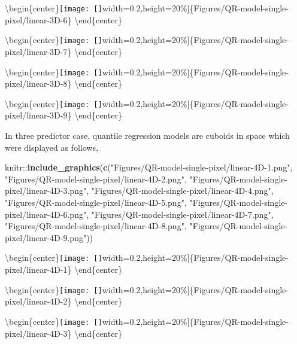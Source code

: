 \documentclass[11pt,a4paper,]{article}
\newenvironment{Shaded}{\begin{snugshade}}{\end{snugshade}}
\newcommand{\KeywordTok}[1]{\textcolor[rgb]{0.13,0.29,0.53}{\textbf{{#1}}}}
\newcommand{\StringTok}[1]{\textcolor[rgb]{0.31,0.60,0.02}{{#1}}}
\newcommand{\NormalTok}[1]{{#1}}
\theoremstyle{definition}
\theoremstyle{definition}
\theoremstyle{remark}
\begin{document}
\textbackslash{}begin\{center\}\texttt{[image: []}width=0.2\linewidth,height=20\%{]}\{Figures/QR-model-single-pixel/linear-3D-6\}
\textbackslash{}end\{center\}

\textbackslash{}begin\{center\}\texttt{[image: []}width=0.2\linewidth,height=20\%{]}\{Figures/QR-model-single-pixel/linear-3D-7\}
\textbackslash{}end\{center\}

\textbackslash{}begin\{center\}\texttt{[image: []}width=0.2\linewidth,height=20\%{]}\{Figures/QR-model-single-pixel/linear-3D-8\}
\textbackslash{}end\{center\}

\textbackslash{}begin\{center\}\texttt{[image: []}width=0.2\linewidth,height=20\%{]}\{Figures/QR-model-single-pixel/linear-3D-9\}
\textbackslash{}end\{center\}

In three predictor case, quantile regression models are cuboids in space
which were displayed as follows,

\begin{Shaded}
\begin{Highlighting}[]
\NormalTok{knitr::}\KeywordTok{include_graphics}\NormalTok{(}\KeywordTok{c}\NormalTok{(}\StringTok{"Figures/QR-model-single-pixel/linear-4D-1.png"}\NormalTok{,}
                          \StringTok{"Figures/QR-model-single-pixel/linear-4D-2.png"}\NormalTok{,}
                          \StringTok{"Figures/QR-model-single-pixel/linear-4D-3.png"}\NormalTok{,}
                          \StringTok{"Figures/QR-model-single-pixel/linear-4D-4.png"}\NormalTok{,}
                          \StringTok{"Figures/QR-model-single-pixel/linear-4D-5.png"}\NormalTok{,}
                          \StringTok{"Figures/QR-model-single-pixel/linear-4D-6.png"}\NormalTok{,}
                          \StringTok{"Figures/QR-model-single-pixel/linear-4D-7.png"}\NormalTok{,}
                          \StringTok{"Figures/QR-model-single-pixel/linear-4D-8.png"}\NormalTok{,}
                          \StringTok{"Figures/QR-model-single-pixel/linear-4D-9.png"}\NormalTok{))}
\end{Highlighting}
\end{Shaded}

\textbackslash{}begin\{center\}\texttt{[image: []}width=0.2\linewidth,height=20\%{]}\{Figures/QR-model-single-pixel/linear-4D-1\}
\textbackslash{}end\{center\}

\textbackslash{}begin\{center\}\texttt{[image: []}width=0.2\linewidth,height=20\%{]}\{Figures/QR-model-single-pixel/linear-4D-2\}
\textbackslash{}end\{center\}

\textbackslash{}begin\{center\}\texttt{[image: []}width=0.2\linewidth,height=20\%{]}\{Figures/QR-model-single-pixel/linear-4D-3\}
\textbackslash{}end\{center\}
\end{document}
